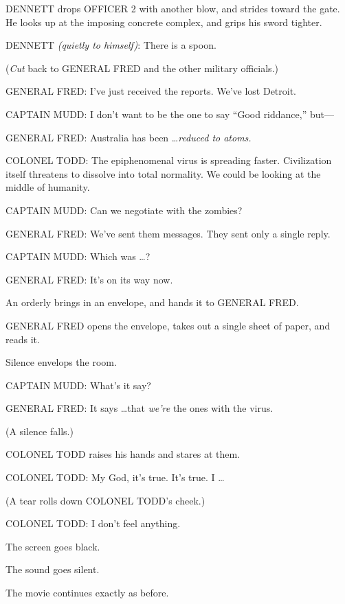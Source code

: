 {
 DENNETT drops OFFICER 2 with another blow, and strides toward the
gate. He looks up at the imposing concrete complex, and grips his sword
tighter.}

{
 DENNETT \textit{(quietly to himself)}: There is a spoon.}

{
 (\textit{Cut} back to GENERAL FRED and the other military
officials.)}

{
 GENERAL FRED: I've just received the reports.
We've lost Detroit.}

{
 CAPTAIN MUDD: I don't want to be the one to say
``Good riddance,'' but---}

{
 GENERAL FRED: Australia has been \ldots \textit{reduced to atoms.}}

{
 COLONEL TODD: The epiphenomenal virus is spreading faster.
Civilization itself threatens to dissolve into total normality. We
could be looking at the middle of humanity.}

{
 CAPTAIN MUDD: Can we negotiate with the zombies?}

{
 GENERAL FRED: We've sent them messages. They sent
only a single reply.}

{
 CAPTAIN MUDD: Which was \ldots ?}

{
 GENERAL FRED: It's on its way now.}

{
 An orderly brings in an envelope, and hands it to GENERAL FRED.}

{
 GENERAL FRED opens the envelope, takes out a single sheet of
paper, and reads it.}

{
 Silence envelops the room.}

{
 CAPTAIN MUDD: What's it say?}

{
 GENERAL FRED: It says \ldots that \textit{we're}
the ones with the virus.}

{
 (A silence falls.)}

{
 COLONEL TODD raises his hands and stares at them.}

{
 COLONEL TODD: My God, it's true.
It's true. I \ldots}

{
 (A tear rolls down COLONEL TODD's cheek.)}

{
 COLONEL TODD: I don't feel anything.}

{
 The screen goes black.}

{
 The sound goes silent.}

{
 The movie continues exactly as before.}

\myendsectiontext


